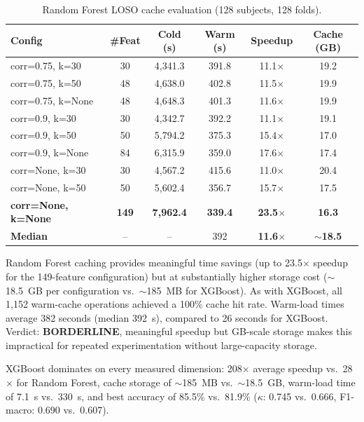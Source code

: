 \begin{table}[htbp]
\centering
\caption[Random Forest LOSO cache evaluation]{Random Forest LOSO cache evaluation (128 subjects, 128 folds).}
\label{tab:rf_cache_results}
\begin{tabular}{lccccc}
\toprule
\textbf{Config} & \textbf{\#Feat} & \textbf{Cold (s)} & \textbf{Warm (s)} & \textbf{Speedup} & \textbf{Cache (GB)} \\
\midrule
corr=0.75, k=30 & 30 & 4{,}341.3 & 391.8 & 11.1$\times$ & 19.2 \\
corr=0.75, k=50 & 48 & 4{,}638.0 & 402.8 & 11.5$\times$ & 19.9 \\
corr=0.75, k=None & 48 & 4{,}648.3 & 401.3 & 11.6$\times$ & 19.9 \\
corr=0.9, k=30 & 30 & 4{,}342.7 & 392.2 & 11.1$\times$ & 19.1 \\
corr=0.9, k=50 & 50 & 5{,}794.2 & 375.3 & 15.4$\times$ & 17.0 \\
corr=0.9, k=None & 84 & 6{,}315.9 & 359.0 & 17.6$\times$ & 17.4 \\
corr=None, k=30 & 30 & 4{,}567.2 & 415.6 & 11.0$\times$ & 20.4 \\
corr=None, k=50 & 50 & 5{,}602.4 & 356.7 & 15.7$\times$ & 17.5 \\
\textbf{corr=None, k=None} & \textbf{149} & \textbf{7{,}962.4} & \textbf{339.4} & \textbf{23.5$\times$} & \textbf{16.3} \\
\midrule
\textbf{Median} & -- & -- & 392 & \textbf{11.6$\times$} & \textbf{$\sim$18.5} \\
\bottomrule
\end{tabular}
\end{table}

Random Forest caching provides meaningful time savings (up to 23.5$\times$ speedup
for the 149-feature configuration) but at substantially higher storage cost
($\sim$18.5~GB per configuration vs.\ $\sim$185~MB for XGBoost). As with XGBoost,
all 1{,}152 warm-cache operations achieved a 100\% cache hit rate.
Warm-load times average 382 seconds (median 392~s), compared to 26 seconds for XGBoost.
Verdict: \textbf{BORDERLINE}, meaningful speedup but GB-scale storage makes this
impractical for repeated experimentation without large-capacity storage.

XGBoost dominates on every measured dimension: 208$\times$ average speedup vs.\ 28$\times$ for Random Forest, cache storage of $\sim$185~MB vs.\ $\sim$18.5~GB, warm-load time of 7.1~s vs.\ 330~s, and best accuracy of 85.5\% vs.\ 81.9\% ($\kappa$: 0.745 vs.\ 0.666, F1-macro: 0.690 vs.\ 0.607).

